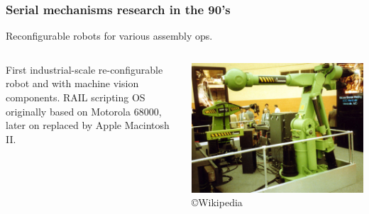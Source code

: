 \begin{frame}
	\frametitle{Serial mechanisms research in the 90's}
	\begin{tcolorbox}[title=Automatix,toggle enlargement=none]
		Reconfigurable robots for various assembly ops.
	\end{tcolorbox}
	\begin{columns}[b]
		\begin{column}{.48\columnwidth}			
			\begin{tcolorbox}[colframe=blue!80!green, coltitle=white!80,toggle enlargement=none]
				First industrial-scale re-configurable robot and with machine vision components. RAIL scripting OS originally based on Motorola 68000, later on replaced by Apple Macintosh II. 
			\end{tcolorbox}
		\end{column}
		\begin{column}{.52\columnwidth}
			\includegraphics[width=\textwidth]{figures/Automatix.jpg}
			\copyright Wikipedia
		\end{column}
	\end{columns}
\end{frame}